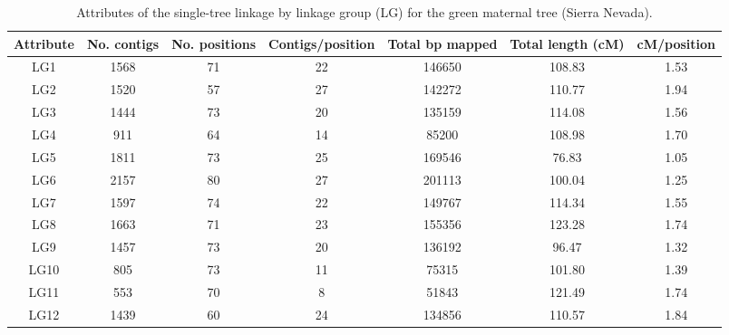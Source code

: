 \documentclass[smallextended]{svjour3}
\begin{document}
\clearpage
\begin{landscape}

\begin{table}[ht]
\caption{Attributes of the single-tree linkage by linkage group (LG) for the green maternal tree (Sierra Nevada).} 
\begin{tabular}{ccccccc}
\toprule
Attribute & No. contigs & No. positions & Contigs/position & Total bp mapped & Total length (cM) & cM/position \\
\midrule
LG1 & 1568 & 71 & 22 & 146650 & 108.83 & 1.53 \\
LG2 & 1520 & 57 & 27 & 142272 & 110.77 & 1.94 \\
LG3 & 1444 & 73 & 20 & 135159 & 114.08 & 1.56 \\
LG4 & 911 & 64 & 14 & 85200 & 108.98 & 1.70 \\
LG5 & 1811 & 73 & 25 & 169546 & 76.83 & 1.05 \\
LG6 & 2157 & 80 & 27 & 201113 & 100.04 & 1.25 \\
LG7 & 1597 & 74 & 22 & 149767 & 114.34 & 1.55 \\
LG8 & 1663 & 71 & 23 & 155356 & 123.28 & 1.74 \\
LG9 & 1457 & 73 & 20 & 136192 & 96.47 & 1.32 \\
LG10 & 805 & 73 & 11 & 75315 & 101.80 & 1.39 \\
LG11 & 553 & 70 & 8 & 51843 & 121.49 & 1.74 \\
LG12 & 1439 & 60 & 24 & 134856 & 110.57 & 1.84 \\
\bottomrule
\end{tabular}
\label{t:label}
\end{table}
\end{landscape}
\end{document}
